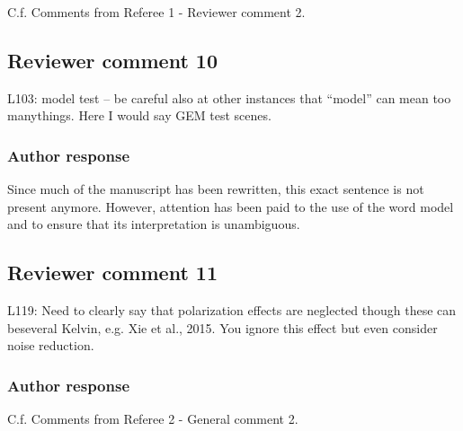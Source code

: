 C.f. Comments from Referee 1 - Reviewer comment 2.

\subsection*{Reviewer comment 10}

L103: model test – be careful also at other instances that “model” can mean too manythings. Here I would say GEM test scenes.

\subsubsection*{Author response}

Since much of the manuscript has been rewritten, this exact sentence is not
present anymore. However, attention has been paid to the use of the word model
and to ensure that its interpretation is unambiguous.

%


\subsection*{Reviewer comment 11}

L119: Need to clearly say that polarization effects are neglected though these can beseveral Kelvin, e.g.  Xie et al., 2015.  You ignore this effect but even consider noise reduction.


\subsubsection*{Author response}

C.f. Comments from Referee 2 - General comment 2.


